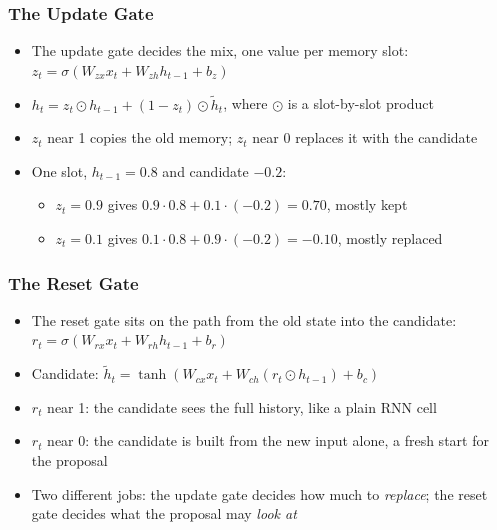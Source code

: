 \begin{frame}[fragile] \frametitle{The Update Gate}
\begin{center}
\end{center}
\begin{itemize}
\item The update gate decides the mix, one value per memory slot: $z_t = \sigma(W_{zx}x_t + W_{zh}h_{t-1} + b_z)$
\item $h_t = z_t \odot h_{t-1} + (1 - z_t) \odot \tilde{h}_t$, where $\odot$ is a slot-by-slot product
\item $z_t$ near 1 copies the old memory; $z_t$ near 0 replaces it with the candidate
\item One slot, $h_{t-1} = 0.8$ and candidate $-0.2$:
  \begin{itemize}
  \item $z_t = 0.9$ gives $0.9 \cdot 0.8 + 0.1 \cdot (-0.2) = 0.70$, mostly kept
  \item $z_t = 0.1$ gives $0.1 \cdot 0.8 + 0.9 \cdot (-0.2) = -0.10$, mostly replaced
  \end{itemize}
\end{itemize}
\end{frame}


\begin{frame}[fragile] \frametitle{The Reset Gate}
\begin{center}
\end{center}
\begin{itemize}
\item The reset gate sits on the path from the old state into the candidate: $r_t = \sigma(W_{rx}x_t + W_{rh}h_{t-1} + b_r)$
\item Candidate: $\tilde{h}_t = \tanh(W_{cx}x_t + W_{ch}(r_t \odot h_{t-1}) + b_c)$
\item $r_t$ near 1: the candidate sees the full history, like a plain RNN cell
\item $r_t$ near 0: the candidate is built from the new input alone, a fresh start for the proposal
\item Two different jobs: the update gate decides how much to \emph{replace}; the reset gate decides what the proposal may \emph{look at}
\end{itemize}
\end{frame}


